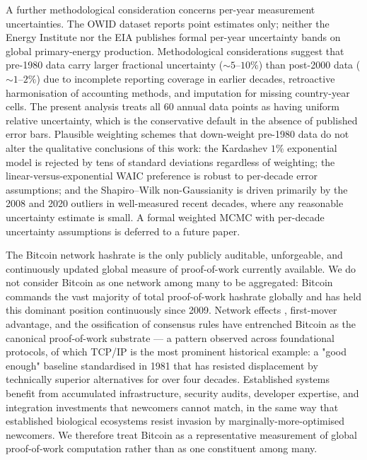 \documentclass[final,5p,times,twocolumn,authoryear]{elsarticle}
\begin{document}
A further methodological consideration concerns per-year measurement 
uncertainties. The OWID dataset reports point estimates only; neither 
the Energy Institute nor the EIA publishes formal per-year uncertainty 
bands on global primary-energy production. Methodological considerations 
suggest that pre-1980 data carry larger fractional uncertainty 
($\sim 5$--$10\%$) than post-2000 data ($\sim 1$--$2\%$) due to 
incomplete reporting coverage in earlier decades, retroactive 
harmonisation of accounting methods, and imputation for missing 
country-year cells. The present analysis treats all 60 annual data 
points as having uniform relative uncertainty, which is the conservative 
default in the absence of published error bars. Plausible weighting 
schemes that down-weight pre-1980 data do not alter the qualitative 
conclusions of this work: the Kardashev $1\%$ exponential model is 
rejected by tens of standard deviations regardless of weighting; the 
linear-versus-exponential WAIC preference is robust to per-decade 
error assumptions; and the Shapiro--Wilk non-Gaussianity is driven 
primarily by the 2008 and 2020 outliers in well-measured recent 
decades, where any reasonable uncertainty estimate is small. A formal 
weighted MCMC with per-decade uncertainty assumptions is deferred to 
a future paper.
 
The Bitcoin network hashrate is the only publicly auditable, 
unforgeable, and continuously updated global measure of 
proof-of-work currently available. We do not consider Bitcoin 
as one network among many to be aggregated: Bitcoin commands the 
vast majority of total proof-of-work hashrate globally and has 
held this dominant position continuously since 2009. Network 
effects \citep{Metcalfe2013}, first-mover advantage, and the 
ossification of consensus rules have entrenched Bitcoin as the 
canonical proof-of-work substrate --- a pattern observed across 
foundational protocols, of which TCP/IP is the most prominent 
historical example: a "good enough" baseline standardised in 1981 
that has resisted displacement by technically superior alternatives 
for over four decades. Established systems benefit from accumulated 
infrastructure, security audits, developer expertise, and integration 
investments that newcomers cannot match, in the same way that 
established biological ecosystems resist invasion by 
marginally-more-optimised newcomers. We therefore treat Bitcoin 
as a representative measurement of global proof-of-work 
computation rather than as one constituent among many.
 
\end{document}
